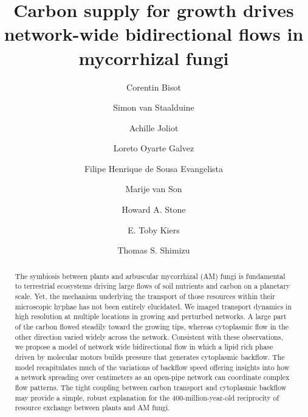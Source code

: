 \title{Carbon supply for growth drives network-wide bidirectional flows in mycorrhizal fungi}

\author[a,b,c,*]{Corentin Bisot}
\author[b,*]{Simon van Staalduine}
\author[b]{Achille Joliot}
\author[a,b]{Loreto Oyarte Galvez}
\author[d]{Filipe Henrique de Sousa Evangelista}
\author[a]{Marije van Son}
\author[d,f]{Howard A. Stone}
\author[a,e,f]{E. Toby Kiers}
\author[b,f]{Thomas S. Shimizu}

\date{}
\maketitle

\begin{abstract}
 
The symbiosis between plants and arbuscular mycorrhizal (AM) fungi is fundamental to terrestrial ecosystems driving large flows of soil nutrients and carbon on a planetary scale. 
Yet, the mechanism underlying the transport of those resources within their microscopic hyphae has not been entirely elucidated. We imaged transport dynamics in high resolution at multiple locations in growing and perturbed networks. A large part of the carbon flowed steadily toward the growing tips, whereas cytoplasmic flow in the other direction varied widely across the network. Consistent with these observations, we propose a model of network wide bidirectional flow in which a lipid rich phase driven by molecular motors builds pressure that generates cytoplasmic backflow. The model recapitulates much of the variations of backflow speed offering insights into how a network spreading over centimeters as an open-pipe network can coordinate complex flow patterns. The tight coupling between carbon transport and cytoplasmic backflow may provide a simple, robust explanation for the 400-million-year-old reciprocity of resource exchange between plants and AM fungi.
\end{abstract}

